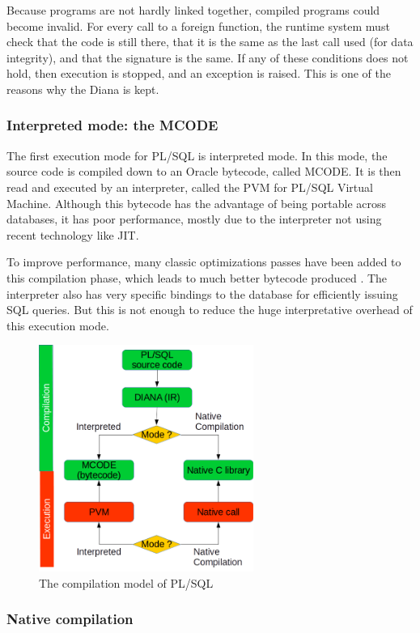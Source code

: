 \documentclass[twoside,11pt,a4paper]{article}
\begin{document}
Because programs are not hardly linked together, compiled programs could become invalid. For every call to a foreign function, the runtime system must check that the code is still there, that it is the same as the last call used (for data integrity), and that the signature is the same. If any of these conditions does not hold, then execution is stopped, and an exception is raised. This is one of the reasons why the Diana is kept.

\subsubsection{Interpreted mode: the MCODE}

The first execution mode for PL/SQL is interpreted mode. In this mode, the source code is compiled down to an Oracle bytecode, called MCODE. It is then read and executed by an interpreter, called the PVM for PL/SQL Virtual Machine. Although this bytecode has the advantage of being portable across databases, it has poor performance, mostly due to the interpreter not using recent technology like JIT.

To improve performance, many classic optimizations passes have been added to this compilation phase, which leads to much better bytecode produced \cite{freedomplsopt}. The interpreter also has very specific bindings to the database for efficiently issuing SQL queries. But this is not enough to reduce the huge interpretative overhead of this execution mode.

\begin{figure}[bt]
	\centering
	\includegraphics[width=7cm]{./graphs/CompilationModel.png}
	\caption{The compilation model of PL/SQL}
\end{figure}

\subsubsection{Native compilation}
\end{document}
